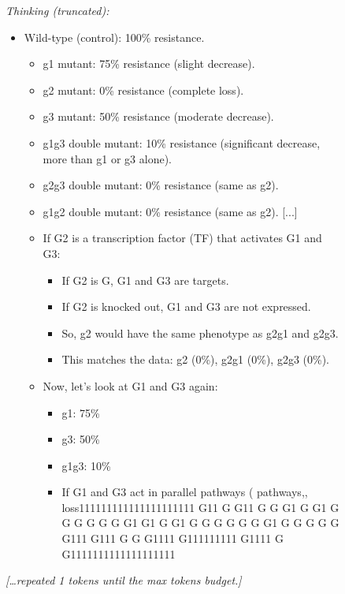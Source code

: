 \begin{figure}[t]
\begin{minipage}[t]{0.49\textwidth}
\begin{mdframed}[style=beforebox]
\noindent\textit{Thinking (truncated):}
\begin{mdframed}[style=thinkbox]
\begin{itemize}[leftmargin=12pt, labelsep=4pt, itemsep=0pt, parsep=0pt, topsep=0pt]
\item Wild-type (control): 100\% resistance.
  \begin{itemize}[leftmargin=12pt, labelsep=4pt, itemsep=0pt, parsep=0pt, topsep=0pt]
  \item g1 mutant: 75\% resistance (slight decrease).
  \item g2 mutant: 0\% resistance (complete loss).
  \item g3 mutant: 50\% resistance (moderate decrease).
  \item g1g3 double mutant: 10\% resistance (significant decrease, more than g1 or g3 alone).
  \item g2g3 double mutant: 0\% resistance (same as g2).
  \item g1g2 double mutant: 0\% resistance (same as g2). [...]
  \item If G2 is a transcription factor (TF) that activates G1 and G3:
    \begin{itemize}[leftmargin=12pt, labelsep=4pt, itemsep=0pt, parsep=0pt, topsep=0pt]
    \item If G2 is G, G1 and G3 are targets.
    \item If G2 is knocked out, G1 and G3 are not expressed.
    \item So, g2 would have the same phenotype as g2g1 and g2g3.
    \item This matches the data: g2 (0\%), g2g1 (0\%), g2g3 (0\%).
    \end{itemize}
  \item Now, let's look at G1 and G3 again:
    \begin{itemize}[leftmargin=12pt, labelsep=4pt, itemsep=0pt, parsep=0pt, topsep=0pt]
    \item g1: 75\%
    \item g3: 50\%
    \item g1g3: 10\%
    \item If G1 and G3 act in parallel pathways ( pathways,, loss111111111111111111111 G11 G G11 G G G1 G G1 G G G G G G G1 G1 G G1 G G G G G G G1 G G G G G G111 G111 G G G1111 G111111111 G1111 G G1111111111111111111
    \end{itemize}
  \end{itemize}
\end{itemize}
{\itshape [\ldots repeated 1 tokens until the max tokens budget.]}

\end{mdframed}
\end{mdframed}
\end{minipage}
\end{figure}
